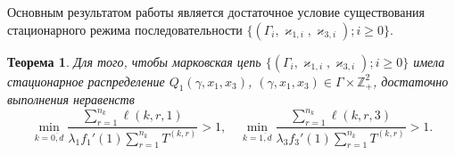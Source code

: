 \documentclass[a4paper,twoside]{article}
\theoremstyle{theorem}
\newtheorem{theorem}{Теорема}
\theoremstyle{remark}
\begin{document}
Основным результатом работы является достаточное условие существования стационарного режима последовательности $\{(\Gamma_i, \varkappa_{1,i},\varkappa_{3,i}); i \geqslant 0\}$.
\begin{theorem}
Для того, чтобы марковская цепь $\{(\Gamma_i, \varkappa_{1,i},\varkappa_{3,i}); i \geqslant 0\}$ имела стационарное распределение $Q_1(\gamma,x_1,x_3)$, $(\gamma,x_1,x_3)\in \Gamma \times {\mathbb Z}^2_+$, достаточно выполнения неравенств
\begin{equation}
\min_{k=\overline{0,d}} { \frac{\sum_{r = 1}^{n_k} \ell(k,r,1) }{\lambda_1 f_1'(1) \sum_{r=1}^{n_k} T^{(k,r)} }}>1, \quad 
\min_{k=\overline{1,d}} { \frac{\sum_{r = 1}^{n_k} \ell(k,r,3) }{\lambda_3 f_3'(1) \sum_{r=1}^{n_k} T^{(k,r)} }}>1.
\label{sufficient:double}
\end{equation}
\end{theorem}
\end{document}
